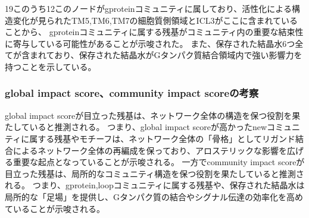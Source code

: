 \newpage

19このうち12このノードがgproteinコミュニティに属しており、活性化による構造変化が見られたTM5,TM6,TM7の細胞質側領域とICL3がここに含まれていることから、
gproteinコミュニティに属する残基がコミュニティ内の重要な結束性に寄与している可能性があることが示唆された。
また、保存された結晶水6つ全てが含まれており、保存された結晶水がGタンパク質結合領域内で強い影響力を持つことを示している。


\subsubsection{global impact score、community impact scoreの考察}

global impact scoreが目立った残基は、ネットワーク全体の構造を保つ役割を果たしていると推測される。
つまり、global impact scoreが高かったnewコミュニティに属する残基やモチーフは、ネットワーク全体の「骨格」としてリガンド結合によるネットワーク全体の再編成を保っており、アロステリックな影響を広げる重要な起点となっていることが示唆される。
一方でcommunity impact scoreが目立った残基は、局所的なコミュニティ構造を保つ役割を果たしていると推測される。
つまり、gprotein,loopコミュニティに属する残基や、保存された結晶水は局所的な「足場」を提供し、Gタンパク質の結合やシグナル伝達の効率化を高めていることが示唆される。





